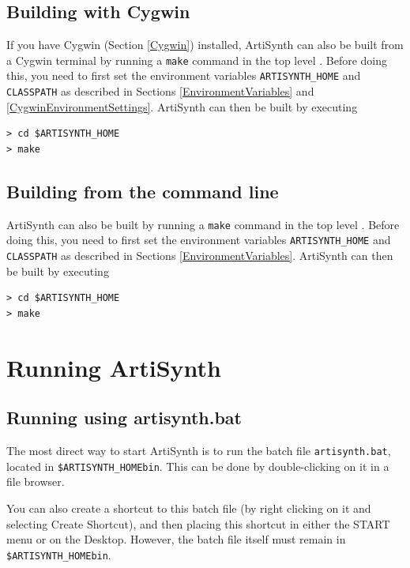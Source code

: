 \ifWindows
\subsection{Building with Cygwin}
\label{BuildingWithCygwin}

If you have Cygwin (Section \ref{Cygwin}) installed, 
ArtiSynth can also be built from a Cygwin terminal by running
a {\tt make} command in the top level \directory. Before doing this,
you need to first set the environment variables {\tt ARTISYNTH\_HOME}
and {\tt CLASSPATH} as described in Sections
\ref{EnvironmentVariables} and \ref{CygwinEnvironmentSettings}.
ArtiSynth can then be built by executing

\begin{verbatim}
> cd $ARTISYNTH_HOME
> make
\end{verbatim}
\else
\subsection{Building from the command line}
\label{BuildingWithCygwin}

ArtiSynth can also be built by running a {\tt make} command in the top
level \directory. Before doing this, you need to first set the environment
variables {\tt ARTISYNTH\_HOME} and {\tt CLASSPATH} as described in
Sections \ref{EnvironmentVariables}. ArtiSynth can then be built by
executing

\begin{verbatim}
> cd $ARTISYNTH_HOME
> make
\end{verbatim}
\fi

\section{Running ArtiSynth}
\label{Running}

\ifWindows
\subsection{Running using artisynth.bat}
\label{artisynthBat}

The most direct way to start ArtiSynth is to run the batch file
{\tt artisynth.bat}, located in {\tt \$ARTISYNTH\_HOME\SEP bin}.  This can be
done by double-clicking on it in a file browser.

You can also create a shortcut to this batch file (by right clicking
on it and selecting {\sf Create Shortcut}), and then placing this shortcut
in either the {\sf START} menu or on the Desktop. However, the batch file
itself must remain in {\tt \$ARTISYNTH\_HOME\SEP bin}.

